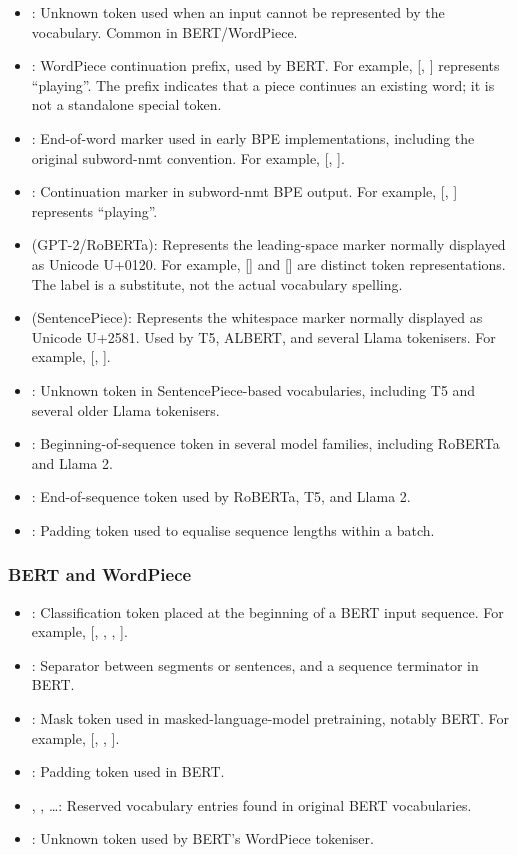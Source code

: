 \begin{itemize}
    \item \tok{[UNK]}: Unknown token used when an input cannot be represented by the vocabulary. Common in BERT/WordPiece.
    \item \tok{##}: WordPiece continuation prefix, used by BERT. For example, [, ] represents ``playing''. The prefix indicates that a piece continues an existing word; it is not a standalone special token.
    \item {}: End-of-word marker used in early BPE implementations, including the original subword-nmt convention. For example, [, ].
    \item {}: Continuation marker in subword-nmt BPE output. For example, [, ] represents ``playing''.
    \item \gspace{} (GPT-2/RoBERTa): Represents the leading-space marker normally displayed as Unicode U+0120. For example, [] and [\gspace{}] are distinct token representations. The label \gspace{} is a substitute, not the actual vocabulary spelling.
    \item \spmspace{} (SentencePiece): Represents the whitespace marker normally displayed as Unicode U+2581. Used by T5, ALBERT, and several Llama tokenisers. For example, [\spmspace{}, \spmspace{}].
    \item {}: Unknown token in SentencePiece-based vocabularies, including T5 and several older Llama tokenisers.
    \item {}: Beginning-of-sequence token in several model families, including RoBERTa and Llama 2.
    \item {}: End-of-sequence token used by RoBERTa, T5, and Llama 2.
    \item {}: Padding token used to equalise sequence lengths within a batch.
\end{itemize}

\subsubsection{BERT and WordPiece}

\begin{itemize}
    \item \tok{[CLS]}: Classification token placed at the beginning of a BERT input sequence. For example, [\tok{[CLS]}, , , \tok{[SEP]}].
    \item \tok{[SEP]}: Separator between segments or sentences, and a sequence terminator in BERT.
    \item \tok{[MASK]}: Mask token used in masked-language-model pretraining, notably BERT. For example, [, \tok{[MASK]}, ].
    \item \tok{[PAD]}: Padding token used in BERT.
    \item \tok{[unused0]}, \tok{[unused1]}, \ldots: Reserved vocabulary entries found in original BERT vocabularies.
    \item \tok{[UNK]}: Unknown token used by BERT's WordPiece tokeniser.
\end{itemize}


